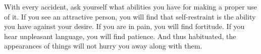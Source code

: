 With every accident, ask yourself what abilities you have for
making a proper use of it. If you see an attractive person, you will
find that self-restraint is the ability you have against your desire.
If you are in pain, you will find fortitude. If you hear unpleasant
language, you will find patience. And thus habituated, the appearances
of things will not hurry you away along with them. 
